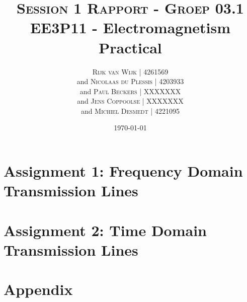 \documentclass[11pt, a4paper, oneside]{article}
\title{\textsc{Session 1 Rapport - Groep 03.1}
	\newline \textbf{EE3P11 - Electromagnetism Practical}\\
}
\author{
	\textsc{Rijk van Wijk | 4261569}\\
	and
	\textsc{Nicolaas du Plessis | 4203933}\\
	and
	\textsc{Paul Beckers | XXXXXXX}\\
	and
	\textsc{Jens Coppoolse | XXXXXXX}\\
	and
	\textsc{Michiel Desmedt | 4221095}\\
}
\date {\today}
\let\stdsection\section
\renewcommand\section{\newpage\stdsection}
\begin{document}
	\maketitle
	\thispagestyle{empty}
	\newpage
	
	\section*{Assignment 1: Frequency Domain Transmission Lines}
	
	\section*{Assignment 2: Time Domain Transmission Lines}
	

	\section*{Appendix}
	
\end{document}
